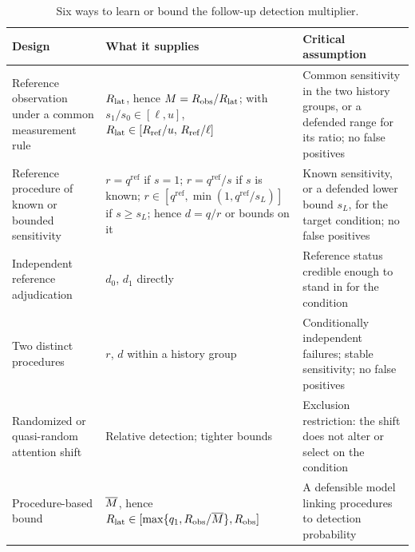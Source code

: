 \begin{table}[tbp]
\centering
\caption{Six ways to learn or bound the follow-up detection
multiplier.}
\label{tab:designs}
\small
\begin{tabular}{>{\raggedright\arraybackslash}p{}>{\raggedright\arraybackslash}p{}>{\raggedright\arraybackslash}p{}}
\toprule
Design & What it supplies & Critical assumption \\
\midrule
Reference observation under a common measurement rule & $R_{\mathrm{lat}}$, hence $M = R_{\mathrm{obs}}/R_{\mathrm{lat}}$; with $s_1/s_0 \in [\ell, u]$, $R_{\mathrm{lat}} \in [R_{\mathrm{ref}}/u,\, R_{\mathrm{ref}}/\ell]$ & Common sensitivity in the two history groups, or a defended range for its ratio; no false positives \\
Reference procedure of known or bounded sensitivity & $r = q^{\mathrm{ref}}$ if $s = 1$; $r = q^{\mathrm{ref}}/s$ if $s$ is known; $r \in [q^{\mathrm{ref}}, \min(1, q^{\mathrm{ref}}/s_L)]$ if $s \ge s_L$; hence $d = q/r$ or bounds on it & Known sensitivity, or a defended lower bound $s_L$, for the target condition; no false positives \\
Independent reference adjudication & $d_0$, $d_1$ directly & Reference status credible enough to stand in for the condition \\
Two distinct procedures & $r$, $d$ within a history group & Conditionally independent failures; stable sensitivity; no false positives \\
Randomized or quasi-random attention shift & Relative detection; tighter bounds & Exclusion restriction: the shift does not alter or select on the condition \\
Procedure-based bound & $\overline{M}$, hence $R_{\mathrm{lat}} \in [\max\{q_1, R_{\mathrm{obs}}/\overline{M}\}, R_{\mathrm{obs}}]$ & A defensible model linking procedures to detection probability \\
\bottomrule
\end{tabular}
\end{table}
